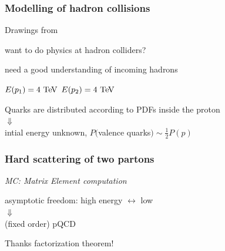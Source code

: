 

\begin{frame}\frametitle{Modelling of hadron collisions}
\small\centering

\begin{flushright}\tiny Drawings from~\cite{Gieseke}\end{flushright}

want to do physics at hadron colliders?

need a good understanding of incoming hadrons

\myskip
\myskip


$E(p_1)=4\tev$ \hspace{.3\paperwidth} $E(p_2)=4\tev$

\vspace{.3\paperheight}

Quarks are distributed according to PDFs inside the proton\\
{\LARGE $\Downarrow$}\\
intial energy unknown, $P($valence quarks$)\sim \frac{1}{2}P(p)$

\end{frame}


\begin{frame}\frametitle{Hard scattering of two partons}
\centering\myskip

\begin{flushright}\footnotesize {\it MC: Matrix Element computation}\end{flushright}


\vspace{.5\paperheight}

{\cccolor asymptotic freedom}: high energy $\longleftrightarrow$ low \alphas\\
{\LARGE $\Downarrow$}\\
(fixed order) pQCD

\begin{flushright}\scriptsize Thanks {\cccolor factorization theorem}!
\end{flushright}

\end{frame}

